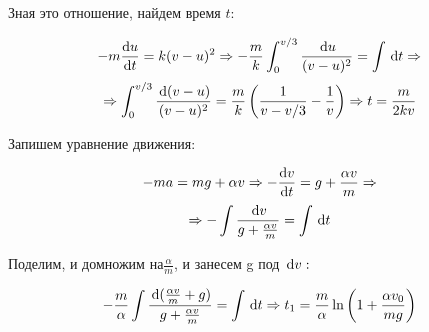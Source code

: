 \documentclass{report}
\begin{document}
Зная это отношение, найдем время $t$:

\begin{center}
\begin{equation}
	-m \diff{u}{t}=k(v-u)^2 \Rightarrow -\frac{m}{k} \int_0^{v/3} \frac{\dl u}{(v-u)^2}=\int \dl t
	\Rightarrow
\end{equation}
\begin{equation}
	\Rightarrow \int_0^{v/3} \frac{\dl (v-u)}{(v-u)^2}=\frac{m}{k}
	\left(\frac{1}{v-v/3}-\frac{1}{v}\right) \Rightarrow t=\dfrac{m}{2kv}
\end{equation}
\end{center}





\sol Запишем уравнение движения: 

\begin{center}
\begin{equation}
-ma=mg+\alpha v \Rightarrow -\diff{v}{t}=g+ \frac{\alpha v}{m} \Rightarrow 
\end{equation}
\begin{equation}
\Rightarrow -\int \dfrac{\dl v}{g+\frac{\alpha v}{m}}=\int \dl t
\end{equation}
\end{center}


Поделим, и домножим на$\frac{\alpha}{m}$, и занесем g под 
$\dl v:$ \begin{center}
\begin{equation}
 -\frac{m}{\alpha} \int \dfrac{\dl{ (\frac{\alpha v}{m}+g})}{g+\frac{\alpha v}{m}}=\int \dl t \Rightarrow t_1=\frac{m}{\alpha}
\ln \left(1+\dfrac{\alpha v_0}{mg}\right)
\end{equation}
\end{center}


\end{document}
